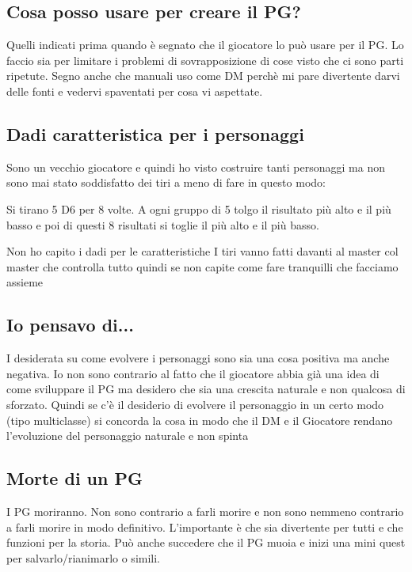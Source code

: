 \subsection{Cosa posso usare per creare il PG?}
Quelli indicati prima quando è segnato che il giocatore lo può usare per il PG.
Lo faccio sia per limitare i problemi di sovrapposizione di cose visto che ci sono parti ripetute.
Segno anche che manuali uso come DM perchè mi pare divertente darvi delle fonti e vedervi spaventati per cosa vi aspettate.

\subsection{Dadi caratteristica per i personaggi}
Sono un vecchio giocatore e quindi ho visto costruire tanti personaggi ma non sono mai stato soddisfatto dei tiri a meno di fare in questo modo:

Si tirano 5 D6 per 8 volte. A ogni gruppo di 5 tolgo il risultato più alto e il più basso e poi di questi 8 risultati si toglie il più alto e il più basso.

\begin{DndComment}{Non ho capito i dadi per le caratteristiche}
I tiri vanno fatti davanti al master col master che controlla tutto quindi se non capite come fare tranquilli che facciamo assieme
\end{DndComment}

\subsection{Io pensavo di...}
I desiderata su come evolvere i personaggi sono sia una cosa positiva ma anche negativa.
Io non sono contrario al fatto che il giocatore abbia già una idea di come sviluppare il PG ma desidero che sia una crescita naturale e non qualcosa di sforzato. Quindi se c'è il desiderio di evolvere il personaggio in un certo modo (tipo multiclasse) si concorda la cosa in modo che il DM e il Giocatore rendano l'evoluzione del personaggio naturale e non spinta

\subsection{Morte di un PG}
I PG moriranno. Non sono contrario a farli morire e non sono nemmeno contrario a farli morire in modo definitivo. L'importante è che sia divertente per tutti e che funzioni per la storia. Può anche succedere che il PG muoia e inizi una mini quest per salvarlo/rianimarlo o simili.

